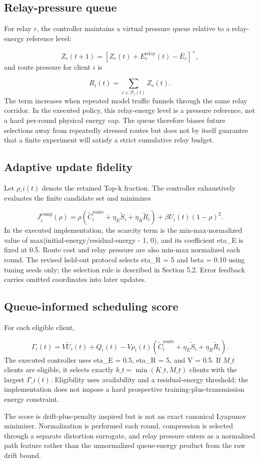 \documentclass[11pt]{article}
\begin{document}
\subsection*{Relay-pressure queue}
For relay \(r\), the controller maintains a virtual pressure queue relative to a relay-energy reference level:\par
\[
Z_r(t+1)=\left[Z_r(t)+E_r^{\mathrm{relay}}(t)-\bar E_r\right]^+,
\]
and route pressure for client \(i\) is\par
\[
R_i(t)=\sum_{r\in\mathcal P_i(t)}Z_r(t).
\]
The term increases when repeated model traffic funnels through the same relay corridor. In the executed policy, this relay-energy level is a pressure reference, not a hard per-round physical energy cap. The queue therefore biases future selections away from repeatedly stressed routes but does not by itself guarantee that a finite experiment will satisfy a strict cumulative relay budget.\par
\subsection*{Adaptive update fidelity}
Let \(\rho\_i(t)\) denote the retained Top-k fraction. The controller exhaustively evaluates the finite candidate set and minimizes\par
\[
J_i^{\mathrm{comp}}(\rho)= \rho\left(\widetilde C_i^{\mathrm{route}}+\eta_E\widetilde S_i+\eta_R\widetilde R_i\right) +\beta U_i(t)(1-\rho)^2.
\]
In the executed implementation, the scarcity term is the min-max-normalized value of max(initial-energy/residual-energy - 1, 0), and its coefficient eta\_E is fixed at 0.5. Route cost and relay pressure are also min-max normalized each round. The revised held-out protocol selects eta\_R = 5 and beta = 0.10 using tuning seeds only; the selection rule is described in Section 5.2. Error feedback carries omitted coordinates into later updates.\par
\subsection*{Queue-informed scheduling score}
For each eligible client,\par
\[
\Gamma_i(t)=V\widetilde U_i(t)+Q_i(t)-V\rho_i(t) \left(\widetilde C_i^{\mathrm{route}}+\eta_E\widetilde S_i+\eta_R\widetilde R_i\right).
\]
The executed controller uses eta\_E = 0.5, eta\_R = 5, and V = 0.5. If \(M\_t\) clients are eligible, it selects exactly \(k\_t=\min(K\_t,M\_t)\) clients with the largest \(\Gamma\_i(t)\). Eligibility uses availability and a residual-energy threshold; the implementation does not impose a hard prospective training-plus-transmission energy constraint.\par
The score is drift-plus-penalty inspired but is not an exact canonical Lyapunov minimizer. Normalization is performed each round, compression is selected through a separate distortion surrogate, and relay pressure enters as a normalized path feature rather than the unnormalized queue-energy product from the raw drift bound.\par
\end{document}
